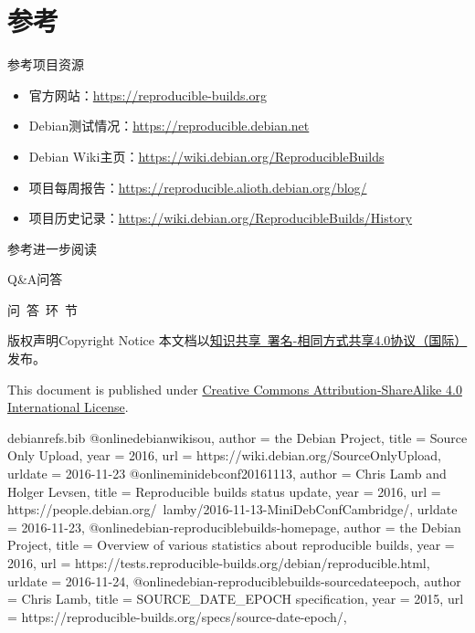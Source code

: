 \documentclass{beamer}
\begin{document}
\section*{参考}
\begin{frame}[t]{参考}{项目资源}
\begin{itemize}
\item 官方网站：\url{https://reproducible-builds.org}
\item Debian测试情况：\url{https://reproducible.debian.net}
\item Debian Wiki主页：\url{https://wiki.debian.org/ReproducibleBuilds}
\item 项目每周报告：\url{https://reproducible.alioth.debian.org/blog/}
\item 项目历史记录：\url{https://wiki.debian.org/ReproducibleBuilds/History}
\end{itemize}
\end{frame}
\begin{frame}{参考}{进一步阅读}
\nocite{*}
\printbibliography
\end{frame}
\begin{frame}{Q\&A}{问答}
\begin{center}
{\Large 问~答~环~节}
\end{center}
\end{frame}
\begin{frame}{版权声明}{Copyright Notice}
本文档以\href{https://creativecommons.org/licenses/by-sa/4.0/legalcode}{知识共享~署名-相同方式共享4.0协议（国际）}发布。
\vspace{1em}

This document is published under \href{https://creativecommons.org/licenses/by-sa/4.0/legalcode}{Creative Commons Attribution-ShareAlike 4.0 International License}.
\end{frame}

\begin{filecontents*}{debianrefs.bib}
@online{debianwikisou,
  author = {the Debian Project},
  title = {Source Only Upload},
  year = 2016,
  url = {https://wiki.debian.org/SourceOnlyUpload},
  urldate = {2016-11-23}
}
@online{minidebconf20161113,
  author = {Chris Lamb and
            Holger Levsen},
  title = {Reproducible builds status update},
  year = 2016,
  url = {https://people.debian.org/~lamby/2016-11-13-MiniDebConfCambridge/},
  urldate = {2016-11-23},
}
@online{debian-reproduciblebuilds-homepage,
  author = {the Debian Project},
  title = {Overview of various statistics about reproducible builds},
  year = 2016,
  url = {https://tests.reproducible-builds.org/debian/reproducible.html},
  urldate = {2016-11-24},
}
@online{debian-reproduciblebuilds-sourcedateepoch,
  author = {Chris Lamb},
  title = {SOURCE\_DATE\_EPOCH specification},
  year = 2015,
  url = {https://reproducible-builds.org/specs/source-date-epoch/},
}
\end{filecontents*}

\end{document}
